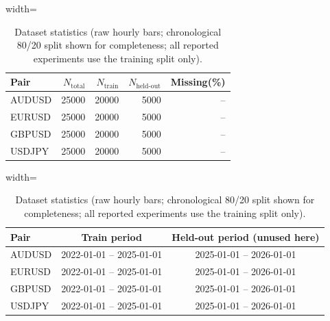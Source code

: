 \begin{table}[!tbp]
\centering
\caption{Dataset statistics (raw hourly bars; chronological 80/20 split shown for completeness; all reported experiments use the training split only).}
\label{tab:dataset}
\begin{adjustbox}{width=\linewidth}
\begin{tabular}{@{}lrrrr@{}}
\toprule
\textbf{Pair} & \textbf{$N_{\text{total}}$} & \textbf{$N_{\text{train}}$} & \textbf{$N_{\text{held-out}}$} & \textbf{Missing(\%)} \\
\midrule
AUDUSD & 25000 & 20000 & 5000 & -- \\
EURUSD & 25000 & 20000 & 5000 & -- \\
GBPUSD & 25000 & 20000 & 5000 & -- \\
USDJPY & 25000 & 20000 & 5000 & -- \\
\bottomrule
\end{tabular}
\end{adjustbox}
\begin{adjustbox}{width=\linewidth}
\begin{tabular}{@{}lcc@{}}
\toprule
\textbf{Pair} & \textbf{Train period} & \textbf{Held-out period (unused here)} \\
\midrule
AUDUSD & 2022-01-01 -- 2025-01-01 & 2025-01-01 -- 2026-01-01 \\
EURUSD & 2022-01-01 -- 2025-01-01 & 2025-01-01 -- 2026-01-01 \\
GBPUSD & 2022-01-01 -- 2025-01-01 & 2025-01-01 -- 2026-01-01 \\
USDJPY & 2022-01-01 -- 2025-01-01 & 2025-01-01 -- 2026-01-01 \\
\bottomrule
\end{tabular}
\end{adjustbox}
\end{table}


